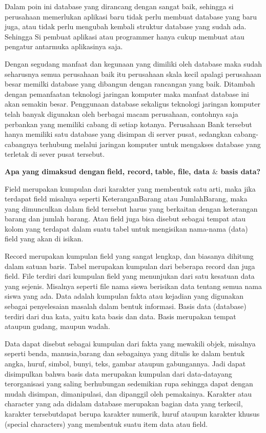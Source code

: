  \par
Dalam poin ini database yang dirancang dengan sangat baik, sehingga si perusahaan memerlukan aplikasi baru tidak perlu membuat database yang baru juga, atau tidak perlu mengubah kembali struktur database yang sudah ada. Sehingga Si pembuat aplikasi atau programmer hanya cukup membuat atau pengatur antarmuka aplikasinya saja. \par
\vspace{12pt}
Dengan segudang manfaat dan kegunaan yang dimiliki oleh database maka sudah seharusnya semua perusahaan baik itu perusahaan skala kecil apalagi perusahaan besar memilki database yang dibangun dengan rancangan yang baik. Ditambah dengan pemanfaatan teknologi jaringan komputer maka manfaat database ini akan semakin besar. Penggunaan database sekaligus teknologi jaringan komputer telah banyak digunakan oleh berbagai macam perusahaan, contohnya saja perbankan yang memiliki cabang di setiap kotanya. Perusahaan Bank tersebut hanya memiliki satu database yang disimpan di server pusat, sedangkan cabang-cabangnya terhubung melalui jaringan komputer untuk mengakses database yang terletak di sever pusat tersebut. \par
\noindent 
\textbf{Apa yang dimaksud dengan}\textbf{ field, record, }\textbf{table, file, data  $  \&  $ basis data?} \par
Field merupakan kumpulan dari karakter yang membentuk satu arti, maka jika terdapat field misalnya seperti KeteranganBarang atau JumlahBarang, maka yang dimunculkan dalam field tersebut harus yang berkaitan dengan keterangan barang dan jumlah barang. Atau field juga bisa disebut sebagai tempat atau kolom yang terdapat dalam suatu tabel untuk mengisikan nama-nama (data) field yang akan di isikan. \par
\vspace{12pt}
Record merupakan kumpulan field yang sangat lengkap, dan biasanya dihitung dalam satuan baris. Tabel merupakan kumpulan dari beberapa record dan juga field. File terdiri dari kumpulan field yang menunjukan dari satu kesatuan data yang sejenis. Misalnya seperti file nama siswa berisikan data tentang semua nama siswa yang ada. Data adalah kumpulan fakta atau kejadian yang digunakan sebagai penyelesaian masalah dalam bentuk informasi. Basis data (database) terdiri dari dua kata, yaitu kata basis dan data. Basis merupakan tempat ataupun gudang, maupun wadah. \par
Data dapat disebut sebagai kumpulan dari fakta yang mewakili objek, misalnya seperti benda, manusia,barang dan sebagainya yang ditulis ke dalam bentuk angka, huruf, simbol, bunyi, teks, gambar ataupun gabungannya. Jadi dapat disimpulkan bahwa basis data merupakan kumpulan dari data-datayang terorganisasi yang saling berhubungan sedemikian rupa sehingga dapat dengan mudah disimpan, dimanipulasi, dan dipanggil oleh pemakainya. Karakter atau character yang ada didalam database merupakan bagian data yang terkecil, karakter tersebutdapat berupa karakter numerik, huruf ataupun karakter khusus (special characters) yang membentuk suatu item data atau field. \par
